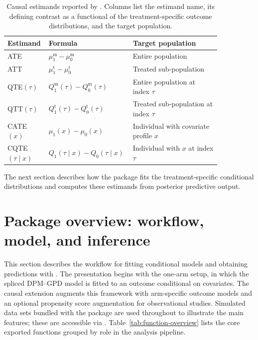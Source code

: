 \documentclass[article]{jss}\usepackage[]{graphicx}\usepackage[]{xcolor}
\begin{document}
\begin{table}[!htbp]
\centering
\small
\caption[Causal estimands reported by the package]{Causal estimands reported by \protect{}. Columns list the estimand name, its defining contrast as a functional of the treatment-specific outcome distributions, and the target population.}
\label{tab:causal-estimands-main}
{
\renewcommand{\arraystretch}{1.08}
\begin{tabular}{
  @{}>{\raggedright\arraybackslash}p{0.15\linewidth}
  >{\centering\arraybackslash}p{0.30\linewidth}
  >{\raggedright\arraybackslash}p{0.40\linewidth}@{}
}
\toprule
Estimand & Formula & Target population \\
\midrule
ATE & $\mu_1^{\mathrm{m}}-\mu_0^{\mathrm{m}}$ & Entire population \\
ATT & $\mu_1^{\mathrm{t}}-\mu_0^{\mathrm{t}}$ & Treated sub-population \\
QTE$(\tau)$ & $Q_1^{\mathrm{m}}(\tau)-Q_0^{\mathrm{m}}(\tau)$ & Entire population at index $\tau$\\
QTT$(\tau)$ & $Q_1^{\mathrm{t}}(\tau)-Q_0^{\mathrm{t}}(\tau)$ & Treated sub-population at index $\tau$\\
CATE$(x)$ & $\mu_1(x)-\mu_0(x)$ & Individual with covariate profile $x$ \\
CQTE$(\tau\mid x)$ & $Q_1(\tau\mid x)-Q_0(\tau\mid x)$ & Individual with $x$ at index $\tau$\\
\bottomrule
\end{tabular}
}
\end{table}

The next section describes how the package fits the treatment-specific
conditional distributions and computes these estimands from posterior
predictive output.


\section{Package overview: workflow, model, and inference}
\label{sec:overview}

This section describes the workflow for fitting conditional models and
obtaining predictions with .  The presentation
begins with the one-arm setup, in which the spliced DPM--GPD model is
fitted to an outcome conditional on covariates. The causal extension augments this
framework with arm-specific outcome models and an optional propensity
score augmentation for observational studies.
Simulated data sets bundled with the package are used throughout to
illustrate the main features; these are accessible via
.
Table~\ref{tab:function-overview} lists the core exported functions
grouped by role in the analysis pipeline.
\end{document}

